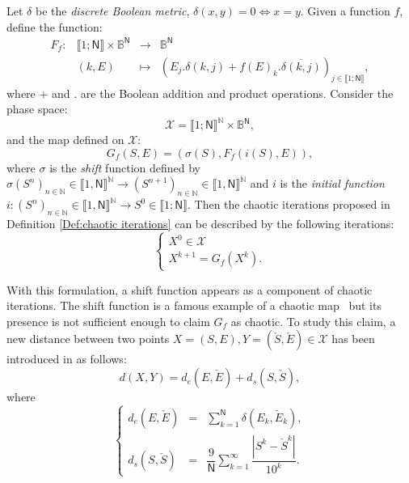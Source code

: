 \documentclass{article}
\begin{document}
Let $\delta $ be the \emph{discrete Boolean metric}, $\delta
(x,y)=0\Leftrightarrow x=y.$ Given a function $f$, define the function:
\begin{equation}
\begin{array}{lrll}
F_{f}: & \llbracket1;\mathsf{N}\rrbracket\times \mathds{B}^{\mathsf{N}} &
\longrightarrow & \mathds{B}^{\mathsf{N}} \\
& (k,E) & \longmapsto & \left( E_{j}.\delta (k,j)+f(E)_{k}.\overline{\delta
(k,j)}\right) _{j\in \llbracket1;\mathsf{N}\rrbracket},\end{array}\end{equation}\noindent where + and . are the Boolean addition and product operations.
Consider the phase space:
\begin{equation}
\mathcal{X} = \llbracket 1 ; \mathsf{N} \rrbracket^\mathds{N} \times
\mathds{B}^\mathsf{N},
\end{equation}
\noindent and the map defined on $\mathcal{X}$:
\begin{equation}
G_f\left(S,E\right) = \left(\sigma(S), F_f(i(S),E)\right), \label{Gf}
\end{equation}
\noindent where $\sigma$ is the \emph{shift} function defined by $\sigma
(S^{n})_{n\in \mathds{N}}\in \llbracket 1, \mathsf{N} \rrbracket^\mathds{N}\longrightarrow (S^{n+1})_{n\in
\mathds{N}}\in \llbracket 1, \mathsf{N} \rrbracket^\mathds{N}$ and $i$ is the \emph{initial function} 
$i:(S^{n})_{n\in \mathds{N}} \in \llbracket 1, \mathsf{N} \rrbracket^\mathds{N}\longrightarrow S^{0}\in \llbracket
1;\mathsf{N}\rrbracket$. Then the chaotic iterations proposed in
Definition \ref{Def:chaotic iterations} can be described by the following iterations:
\begin{equation}
\left\{
\begin{array}{l}
X^0 \in \mathcal{X} \\
X^{k+1}=G_{f}(X^k).\end{array}\right.
\end{equation}

With this formulation, a shift function appears as a component of chaotic
iterations. The shift function is a famous example of a chaotic
map~\cite{Devaney} but its presence is not sufficient enough to claim $G_f$ as
chaotic. 
To study this claim, a new distance between two points $X = (S,E), Y =
(\check{S},\check{E})\in
\mathcal{X}$ has been introduced in \cite{guyeux10} as follows:
\begin{equation}
d(X,Y)=d_{e}(E,\check{E})+d_{s}(S,\check{S}),
\end{equation}
\noindent where
\begin{equation}
\left\{
\begin{array}{lll}
\displaystyle{d_{e}(E,\check{E})} & = & \displaystyle{\sum_{k=1}^{\mathsf{N}}\delta (E_{k},\check{E}_{k})}, \\
\displaystyle{d_{s}(S,\check{S})} & = & \displaystyle{\dfrac{9}{\mathsf{N}}\sum_{k=1}^{\infty }\dfrac{|S^k-\check{S}^k|}{10^{k}}}.\end{array}\right.
\end{equation}
\end{document}
